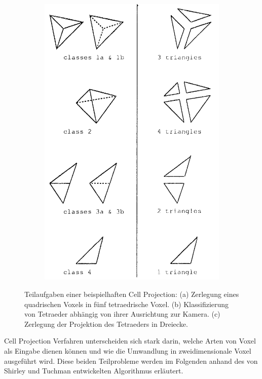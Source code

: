 \documentclass[a4paper,fontsize=12pt,toc=bib,halfparskip,ngerman]{scrartcl}
\begin{document}
\begin{figure}
\begin{subfigure}{0.3\textwidth}
		\subcaption{}
		\label{Classes}
	\end{subfigure}
	\begin{subfigure}{0.3\textwidth}
		\centering
		\includegraphics[width=\textwidth]{pictures/Triangle.png}
		\subcaption{}
		\label{Triangle}
	\end{subfigure}
	\caption{Teilaufgaben einer beispielhaften Cell Projection: (a) Zerlegung eines quadrischen Voxels in f\"unf tetraedrische Voxel. (b) Klassifizierung von Tetraeder abh\"angig von ihrer Ausrichtung zur Kamera. (c) Zerlegung der Projektion des Tetraeders in Dreiecke.}
\end{figure}

Cell Projection Verfahren unterscheiden sich stark darin, welche Arten von Voxel als Eingabe dienen k\"onnen und wie die Umwandlung in zweidimensionale Voxel ausgef\"uhrt wird. Diese beiden Teilprobleme werden im Folgenden anhand des von Shirley und Tuchman \cite{shirley1990polygonal} entwickelten Algorithmus erl\"autert.
\end{document}
